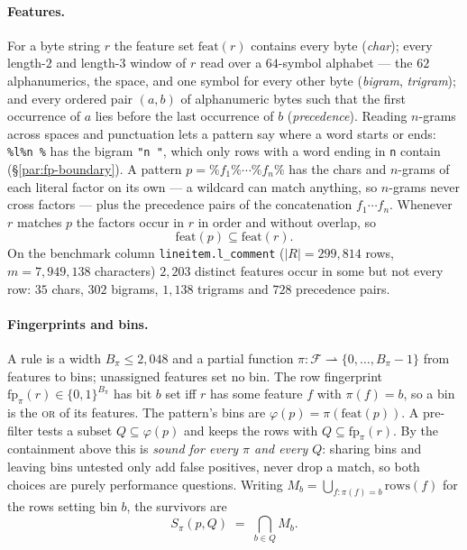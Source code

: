 \paragraph{Features.}
\label{par:fp-features}
For a byte string $r$ the feature set $\mathrm{feat}(r)$ contains every
byte (\emph{char}); every length-$2$ and length-$3$ window of $r$ read
over a $64$-symbol alphabet --- the $62$ alphanumerics, the space, and
one symbol for every other byte (\emph{bigram}, \emph{trigram}); and
every ordered pair $(a, b)$ of alphanumeric bytes such that the first
occurrence of $a$ lies before the last occurrence of $b$
(\emph{precedence}). Reading $n$-grams across spaces and punctuation lets
a pattern say where a word starts or ends: \texttt{\%l\%n\ \%} has the
bigram \texttt{"n\ "}, which only rows with a word ending in \texttt{n}
contain (\S\ref{par:fp-boundary}). A pattern $p = \%f_1\%\cdots\%f_n\%$
has the chars and $n$-grams of each literal factor on its own --- a
wildcard can match anything, so $n$-grams never cross factors --- plus
the precedence pairs of the concatenation $f_1 \cdots f_n$. Whenever $r$
matches $p$ the factors occur in $r$ in order and without overlap, so
\[
  \mathrm{feat}(p) \subseteq \mathrm{feat}(r).
\]
On the benchmark column \texttt{lineitem.l\_comment} ($|R| = 299{,}814$
rows, $m = 7{,}949{,}138$ characters) $2{,}203$ distinct features occur
in some but not every row: $35$ chars, $302$ bigrams, $1{,}138$ trigrams
and $728$ precedence pairs.

\paragraph{Fingerprints and bins.}
A rule is a width $B_\pi \le 2{,}048$ and a partial function
$\pi : \mathcal{F} \rightharpoonup \{0, \dots, B_\pi - 1\}$ from features
to bins; unassigned features set no bin. The row fingerprint
$\mathrm{fp}_\pi(r) \in \{0,1\}^{B_\pi}$ has bit $b$ set iff $r$ has some
feature $f$ with $\pi(f) = b$, so a bin is the \textsc{or} of its
features. The pattern's bins are $\varphi(p) = \pi(\mathrm{feat}(p))$. A
pre-filter tests a subset $Q \subseteq \varphi(p)$ and keeps the rows
with $Q \subseteq \mathrm{fp}_\pi(r)$. By the containment above this is
\emph{sound for every $\pi$ and every $Q$}: sharing bins and leaving bins
untested only add false positives, never drop a match, so both choices
are purely performance questions. Writing $M_b = \bigcup_{f : \pi(f) = b}
\mathrm{rows}(f)$ for the rows setting bin $b$, the survivors are
\[
  S_\pi(p, Q) \;=\; \bigcap_{b \in Q} M_b .
\]

